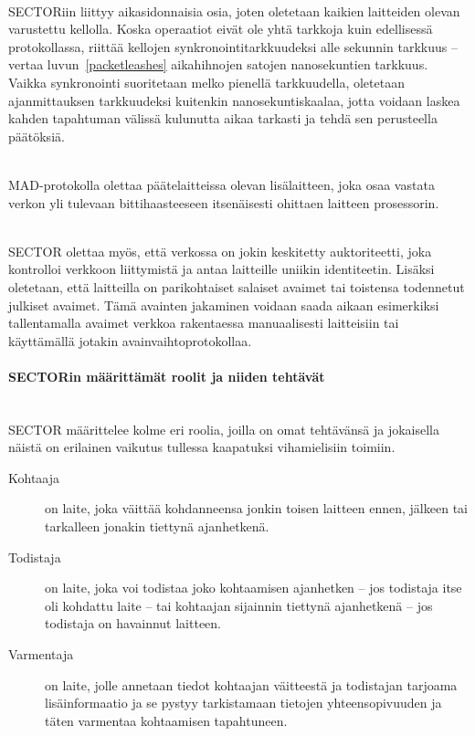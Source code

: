 \documentclass[finnish]{tktltiki2}
\theoremstyle{definition}
\theoremstyle{remark}
\begin{document}
\noindent \\
SECTORiin liittyy aikasidonnaisia osia, joten oletetaan kaikien laitteiden olevan varustettu kellolla. Koska operaatiot eivät ole yhtä tarkkoja kuin edellisessä protokollassa, riittää kellojen synkronointitarkkuudeksi alle sekunnin tarkkuus -- vertaa luvun~\ref{packetleashes} aikahihnojen satojen nanosekuntien tarkkuus. Vaikka synkronointi suoritetaan melko pienellä tarkkuudella, oletetaan ajanmittauksen tarkkuudeksi kuitenkin nanosekuntiskaalaa, jotta voidaan laskea kahden tapahtuman välissä kulunutta aikaa tarkasti ja tehdä sen perusteella päätöksiä.

\noindent\\
MAD-protokolla olettaa päätelaitteissa olevan lisälaitteen, joka osaa vastata verkon yli tulevaan bittihaasteeseen itsenäisesti ohittaen laitteen prosessorin.

\noindent\\
SECTOR olettaa myös, että verkossa on jokin keskitetty auktoriteetti, joka kontrolloi verkkoon liittymistä ja antaa laitteille uniikin identiteetin. Lisäksi oletetaan, että laitteilla on parikohtaiset salaiset avaimet tai toistensa todennetut julkiset avaimet. Tämä avainten jakaminen voidaan saada aikaan esimerkiksi tallentamalla avaimet verkkoa rakentaessa manuaalisesti laitteisiin tai käyttämällä jotakin avainvaihtoprotokollaa.

\paragraph{SECTORin määrittämät roolit ja niiden tehtävät}
\noindent\\
SECTOR määrittelee kolme eri roolia, joilla on omat tehtävänsä ja jokaisella näistä on erilainen vaikutus tullessa kaapatuksi vihamielisiin toimiin.

\begin{description}
\item[Kohtaaja] on laite, joka väittää kohdanneensa jonkin toisen laitteen ennen, jälkeen tai tarkalleen jonakin tiettynä ajanhetkenä.
\item[Todistaja] on laite, joka voi todistaa joko kohtaamisen ajanhetken -- jos todistaja itse oli kohdattu laite -- tai kohtaajan sijainnin tiettynä ajanhetkenä -- jos todistaja on havainnut laitteen.
\item[Varmentaja] on laite, jolle annetaan tiedot kohtaajan väitteestä ja todistajan tarjoama lisäinformaatio ja se pystyy tarkistamaan tietojen yhteensopivuuden ja täten varmentaa kohtaamisen tapahtuneen.
\end{description}
\end{document}
